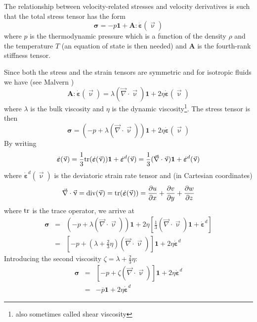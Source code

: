 The relationship between velocity-related stresses and
velocity derivatives is such that the total stress tensor has the form \cite{berc09}
\begin{equation}
{\bm \sigma} = -p {\bm 1} + {\bm A}:\dot{\bm \varepsilon}(\vec\upnu)
\end{equation}
where $p$ is the thermodynamic pressure which is a function of the density $\rho$ and the temperature $T$ (an equation of state is then needed)
and ${\bm A}$ is the fourth-rank stiffness tensor.

Since both the stress and the strain tensors are symmetric and for isotropic 
fluids we have (see Malvern \cite{malvern})
\begin{equation}
{\bm A}:\dot{\bm \varepsilon}(\vec\upnu) 
= \lambda (\vec\nabla\cdot\vec\upnu) {\bm 1} + 2\eta \dot{\bm \varepsilon}(\vec\upnu)
\end{equation}
where $\lambda$ is the bulk viscosity and $\eta$ is the dynamic viscosity\footnote{also sometimes called shear viscosity}. 
The stress tensor is then 
\begin{equation}
{\bm \sigma} = (-p  + \lambda (\vec\nabla\cdot\vec\upnu)) {\bm 1} + 2\eta \dot{\bm \varepsilon}(\vec\upnu)
\end{equation}
By writing 
\[
\dot{\bm \varepsilon}(\vec\upnu) 
= \frac{1}{3}{\rm tr}(\dot{\bm \varepsilon}(\vec\upnu)) {\bm 1} + \dot{\bm \varepsilon}^d(\vec\upnu) =
 \frac{1}{3}(\vec\nabla\cdot\vec\upnu) {\bm 1} + \dot{\bm \varepsilon}^d (\vec\upnu)
\]
where $\dot{\bm \varepsilon}^d(\vec\upnu)$ is the deviatoric strain rate tensor and 
(in Cartesian coordinates)
\begin{equation}
\vec\nabla\cdot\vec\upnu = 
\text{div} (\vec\upnu ) =
{\rm tr}(\dot{\bm \varepsilon}(\vec\upnu)) =
\frac{\partial u}{\partial x}+ 
\frac{\partial v}{\partial y}+ 
\frac{\partial w}{\partial z} 
\end{equation} 
where ${\rm tr}$ is the trace operator, we arrive at
\begin{eqnarray}
{\bm \sigma} 
&=& (-p+\lambda(\vec\nabla\cdot\vec\upnu)) {\bm 1} + 2\eta \left[ \frac{1}{3}(\vec\nabla\cdot\vec\upnu) {\bm 1} + \dot{\bm \varepsilon}^d \right] \\
&=& \left[ -p+\left(\lambda+\frac{2}{3}\eta\right)(\vec\nabla\cdot\vec\upnu)\right] {\bm 1} + 2\eta  \dot{\bm \varepsilon}^d  
\end{eqnarray}
Introducing the second viscosity $\zeta=\lambda+\frac{2}{3}\eta$:
\begin{eqnarray}
{\bm \sigma} 
&=& \left[ -p+ \zeta (\vec\nabla\cdot\vec\upnu)\right] {\bm 1} + 2\eta  \dot{\bm \varepsilon}^d \\ 
&=&  -\overline{p} {\bm 1} + 2\eta  \dot{\bm \varepsilon}^d  
\end{eqnarray}
